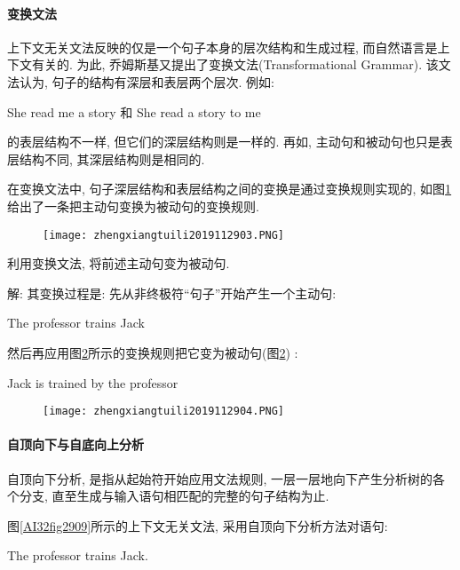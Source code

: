 \paragraph{变换文法}
上下文无关文法反映的仅是一个句子本身的层次结构和生成过程, 而自然语言是上下文有关的. 为此, 乔姆斯基又提出了变换文法(Transformational  Grammar). 该文法认为, 句子的结构有深层和表层两个层次. 例如:
\begin{center}
  She  read  me  a  story  和  She  read  a  story  to  me
\end{center}
的表层结构不一样, 但它们的深层结构则是一样的. 再如, 主动句和被动句也只是表层结构不同, 其深层结构则是相同的.

在变换文法中, 句子深层结构和表层结构之间的变换是通过变换规则实现的, 如图\ref{AI32fig2903}给出了一条把主动句变换为被动句的变换规则.
\begin{figure}[H]
\centering
\texttt{[image: zhengxiangtuili2019112903.PNG]}
\caption{}
\label{AI32fig2903}
\end{figure}
\begin{example}
  利用变换文法, 将前述主动句变为被动句.
\end{example}

解: 其变换过程是: 先从非终极符“句子”开始产生一个主动句:
\begin{center}
  The  professor  trains  Jack
\end{center}

然后再应用图\ref{AI32fig2904}所示的变换规则把它变为被动句(图\ref{AI32fig2904}) :
\begin{center}
  Jack  is  trained  by  the  professor
\end{center}
\begin{figure}[H]
\centering
\texttt{[image: zhengxiangtuili2019112904.PNG]}
\caption{}
\label{AI32fig2904}
\end{figure}
\paragraph{自顶向下与自底向上分析}
    自顶向下分析, 是指从起始符开始应用文法规则, 一层一层地向下产生分析树的各个分支, 直至生成与输入语句相匹配的完整的句子结构为止.

\begin{example}
图\ref{AI32fig2909}所示的上下文无关文法, 采用自顶向下分析方法对语句:
\begin{center}
  The  professor  trains  Jack.
\end{center}
\end{example}

